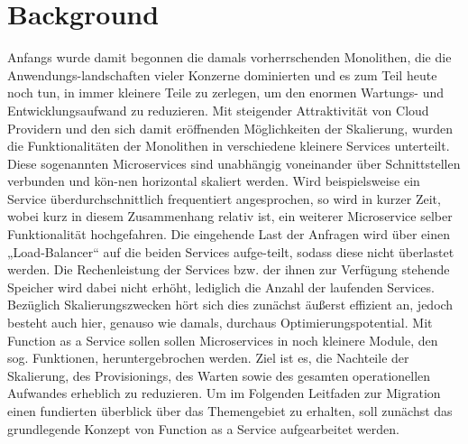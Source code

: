 \documentclass[11pt]{article}
\begin{document}
\section{Background}
Anfangs wurde damit begonnen die damals vorherrschenden Monolithen, die die Anwendungs-landschaften vieler Konzerne dominierten und es zum Teil heute noch tun, in immer kleinere Teile zu zerlegen, um den enormen Wartungs- und Entwicklungsaufwand zu reduzieren. Mit steigender Attraktivität von Cloud Providern und den sich damit eröffnenden Möglichkeiten der Skalierung, wurden die Funktionalitäten der Monolithen in verschiedene kleinere Services unterteilt. Diese sogenannten Microservices sind unabhängig voneinander über Schnittstellen verbunden und kön-nen horizontal skaliert werden. Wird beispielsweise ein Service überdurchschnittlich frequentiert angesprochen, so wird in kurzer Zeit, wobei kurz in diesem Zusammenhang relativ ist, ein weiterer Microservice selber Funktionalität hochgefahren. Die eingehende Last der Anfragen wird über einen „Load-Balancer“ auf die beiden Services aufge-teilt, sodass diese nicht überlastet werden. Die Rechenleistung der Services bzw. der ihnen zur Verfügung stehende Speicher wird dabei nicht erhöht, lediglich die Anzahl der laufenden Services. Bezüglich Skalierungszwecken hört sich dies zunächst äußerst effizient an, jedoch besteht auch hier, genauso wie damals, durchaus Optimierungspotential. Mit Function as a Service sollen sollen Microservices in noch kleinere Module, den sog. Funktionen, heruntergebrochen werden. Ziel ist es, die Nachteile der Skalierung, des Provisionings, des Warten sowie des gesamten operationellen Aufwandes erheblich zu reduzieren. Um im Folgenden Leitfaden zur Migration einen fundierten überblick über das Themengebiet zu erhalten, soll zunächst das grundlegende Konzept von Function as a Service aufgearbeitet werden.
\end{document}
